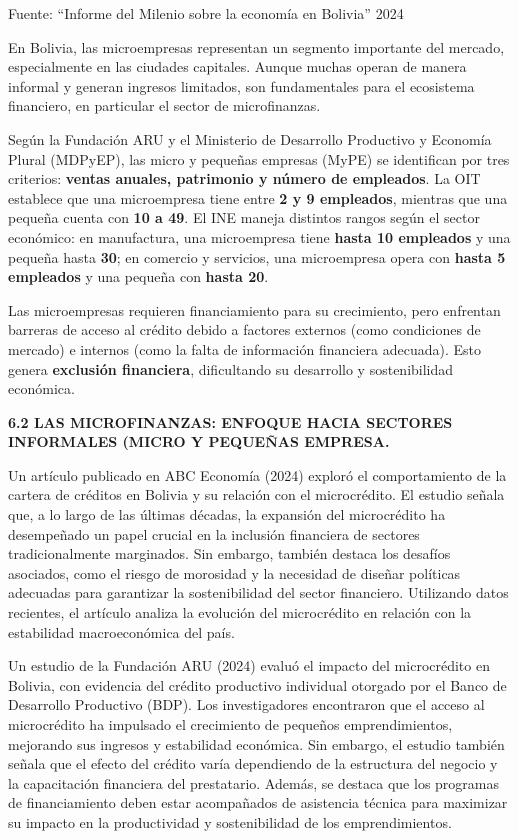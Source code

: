 \documentclass[Royal,times,sageh]{sagej}
\begin{document}
Fuente: ``Informe del Milenio sobre la economía en Bolivia'' 2024

En Bolivia, las microempresas representan un segmento importante del
mercado, especialmente en las ciudades capitales. Aunque muchas operan
de manera informal y generan ingresos limitados, son fundamentales para
el ecosistema financiero, en particular el sector de microfinanzas.

Según la Fundación ARU y el Ministerio de Desarrollo Productivo y
Economía Plural (MDPyEP), las micro y pequeñas empresas (MyPE) se
identifican por tres criterios: \textbf{ventas anuales, patrimonio y
número de empleados}. La OIT establece que una microempresa tiene entre
\textbf{2 y 9 empleados}, mientras que una pequeña cuenta con \textbf{10
a 49}. El INE maneja distintos rangos según el sector económico: en
manufactura, una microempresa tiene \textbf{hasta 10 empleados} y una
pequeña hasta \textbf{30}; en comercio y servicios, una microempresa
opera con \textbf{hasta 5 empleados} y una pequeña con \textbf{hasta
20}.

Las microempresas requieren financiamiento para su crecimiento, pero
enfrentan barreras de acceso al crédito debido a factores externos (como
condiciones de mercado) e internos (como la falta de información
financiera adecuada). Esto genera \textbf{exclusión financiera},
dificultando su desarrollo y sostenibilidad económica.

\textbf{6.2 LAS MICROFINANZAS: ENFOQUE HACIA SECTORES INFORMALES (MICRO
Y PEQUEÑAS EMPRESA.}

Un artículo publicado en ABC Economía (2024) exploró el comportamiento
de la cartera de créditos en Bolivia y su relación con el microcrédito.
El estudio señala que, a lo largo de las últimas décadas, la expansión
del microcrédito ha desempeñado un papel crucial en la inclusión
financiera de sectores tradicionalmente marginados. Sin embargo, también
destaca los desafíos asociados, como el riesgo de morosidad y la
necesidad de diseñar políticas adecuadas para garantizar la
sostenibilidad del sector financiero. Utilizando datos recientes, el
artículo analiza la evolución del microcrédito en relación con la
estabilidad macroeconómica del país.

Un estudio de la Fundación ARU (2024) evaluó el impacto del microcrédito
en Bolivia, con evidencia del crédito productivo individual otorgado por
el Banco de Desarrollo Productivo (BDP). Los investigadores encontraron
que el acceso al microcrédito ha impulsado el crecimiento de pequeños
emprendimientos, mejorando sus ingresos y estabilidad económica. Sin
embargo, el estudio también señala que el efecto del crédito varía
dependiendo de la estructura del negocio y la capacitación financiera
del prestatario. Además, se destaca que los programas de financiamiento
deben estar acompañados de asistencia técnica para maximizar su impacto
en la productividad y sostenibilidad de los emprendimientos.
\end{document}

